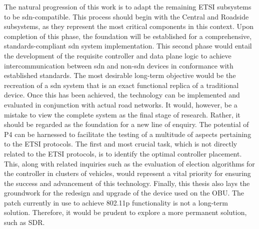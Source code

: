 The natural progression of this work is to adapt the remaining ETSI subsystems to be \gls{sdn}-compatible. This process should begin with the Central and Roadside subsystems, as they represent the most critical components in this context. 
Upon completion of this phase, the foundation will be established for a comprehensive, standards-compliant \gls{sdn} system implementation. This second phase would entail the development of the requisite controller and data plane logic to achieve intercommunication between \gls{sdn} and non-\gls{sdn} devices in conformance with established standards.
The most desirable long-term objective would be the recreation of a \gls{sdn} system that is an exact functional replica of a traditional device. Once this has been achieved, the technology can be implemented and evaluated in conjunction with actual road networks.
It would, however, be a mistake to view the complete system as the final stage of research. Rather, it should be regarded as the foundation for a new line of enquiry. The potential of P4 can be harnessed to facilitate the testing of a multitude of aspects pertaining to the ETSI protocols. The first and most crucial task, which is not directly related to the ETSI protocols, is to identify the optimal controller placement. This, along with related inquiries such as the evaluation of election algorithms for the controller in clusters of vehicles, would represent a vital priority for ensuring the success and advancement of this technology.
Finally, this thesis also lays the groundwork for the redesign and upgrade of the device used on the OBU. The patch currently in use to achieve 802.11p functionality is not a long-term solution. Therefore, it would be prudent to explore a more permanent solution, such as SDR.
